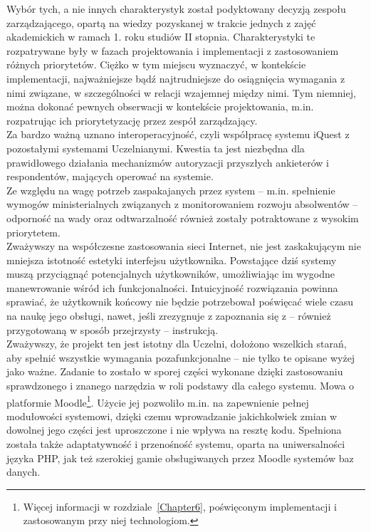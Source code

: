 Wybór tych, a nie innych charakterystyk został podyktowany decyzją zespołu zarządzającego, opartą na wiedzy pozyskanej w trakcie jednych z zajęć akademickich w ramach 1. roku studiów II stopnia. Charakterystyki te rozpatrywane były w fazach projektowania i implementacji z zastosowaniem różnych priorytetów. Ciężko w tym miejscu wyznaczyć, w kontekście implementacji, najważniejsze bądź najtrudniejsze do osiągnięcia wymagania z nimi związane, w szczególności w relacji wzajemnej między nimi. Tym niemniej, można dokonać pewnych obserwacji w kontekście projektowania, m.in. rozpatrując ich priorytetyzację przez zespół zarządzający. \\

Za bardzo ważną uznano interoperacyjność, czyli współpracę systemu iQuest z pozostałymi systemami Uczelnianymi. Kwestia ta jest niezbędna dla prawidłowego działania mechanizmów autoryzacji przyszłych ankieterów i respondentów, mających operować na systemie. \\

Ze względu na wagę potrzeb zaspakajanych przez system -- m.in. spełnienie wymogów ministerialnych związanych z monitorowaniem rozwoju absolwentów -- odporność na wady oraz odtwarzalność również zostały potraktowane z wysokim priorytetem. \\

Zważywszy na współczesne zastosowania sieci Internet, nie jest zaskakującym nie mniejsza istotność estetyki interfejsu użytkownika. Powstające dziś systemy muszą przyciągnąć potencjalnych użytkowników, umożliwiając im wygodne manewrowanie wśród ich funkcjonalności. Intuicyjność rozwiązania powinna sprawiać, że użytkownik końcowy nie będzie potrzebował poświęcać wiele czasu na naukę jego obsługi, nawet, jeśli zrezygnuje z zapoznania się z -- również przygotowaną w sposób przejrzysty -- instrukcją. \\

Zważywszy, że projekt ten jest istotny dla Uczelni, dołożono wszelkich starań, aby spełnić wszystkie wymagania pozafunkcjonalne -- nie tylko te opisane wyżej jako ważne. Zadanie to zostało w sporej części wykonane dzięki zastosowaniu sprawdzonego i znanego narzędzia w roli podstawy dla całego systemu. Mowa o platformie Moodle\footnote{Więcej informacji w rozdziale~\ref{Chapter6}, poświęconym implementacji i zastosowanym przy niej technologiom.}. Użycie jej pozwoliło m.in. na zapewnienie pełnej modułowości systemowi, dzięki czemu wprowadzanie jakichkolwiek zmian w dowolnej jego części jest uproszczone i nie wpływa na resztę kodu. Spełniona została także adaptatywność i przenośność systemu, oparta na uniwersalności języka PHP, jak też szerokiej gamie obsługiwanych przez Moodle systemów baz danych. \\

